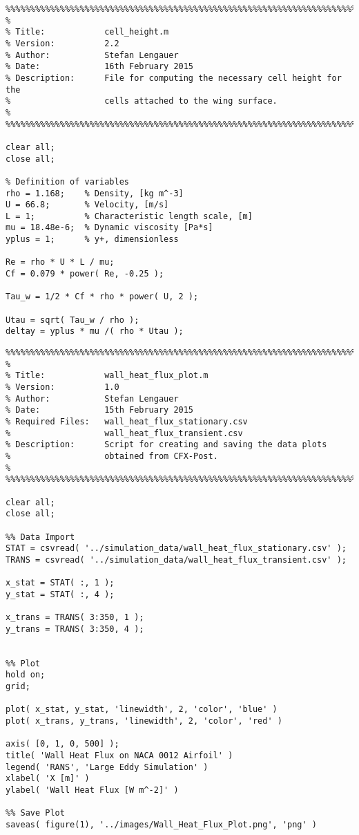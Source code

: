 \begin{lstlisting}
%%%%%%%%%%%%%%%%%%%%%%%%%%%%%%%%%%%%%%%%%%%%%%%%%%%%%%%%%%%%%%%%%%%%%%%%%%%
%
% Title:            cell_height.m
% Version:          2.2
% Author:           Stefan Lengauer
% Date:             16th February 2015
% Description:      File for computing the necessary cell height for the
%                   cells attached to the wing surface.
%
%%%%%%%%%%%%%%%%%%%%%%%%%%%%%%%%%%%%%%%%%%%%%%%%%%%%%%%%%%%%%%%%%%%%%%%%%%%

clear all;
close all;

% Definition of variables
rho = 1.168;    % Density, [kg m^-3]
U = 66.8;       % Velocity, [m/s]
L = 1;          % Characteristic length scale, [m]
mu = 18.48e-6;  % Dynamic viscosity [Pa*s]
yplus = 1;      % y+, dimensionless

Re = rho * U * L / mu;
Cf = 0.079 * power( Re, -0.25 );

Tau_w = 1/2 * Cf * rho * power( U, 2 );

Utau = sqrt( Tau_w / rho );
deltay = yplus * mu /( rho * Utau );
\end{lstlisting}
\newpage
\begin{lstlisting}
%%%%%%%%%%%%%%%%%%%%%%%%%%%%%%%%%%%%%%%%%%%%%%%%%%%%%%%%%%%%%%%%%%%%%%%%%%%
%
% Title:            wall_heat_flux_plot.m
% Version:          1.0
% Author:           Stefan Lengauer
% Date:             15th February 2015
% Required Files:   wall_heat_flux_stationary.csv
%                   wall_heat_flux_transient.csv
% Description:      Script for creating and saving the data plots
%                   obtained from CFX-Post.
%
%%%%%%%%%%%%%%%%%%%%%%%%%%%%%%%%%%%%%%%%%%%%%%%%%%%%%%%%%%%%%%%%%%%%%%%%%%%

clear all;
close all;

%% Data Import
STAT = csvread( '../simulation_data/wall_heat_flux_stationary.csv' );
TRANS = csvread( '../simulation_data/wall_heat_flux_transient.csv' );

x_stat = STAT( :, 1 );
y_stat = STAT( :, 4 );

x_trans = TRANS( 3:350, 1 );
y_trans = TRANS( 3:350, 4 );


%% Plot
hold on;
grid;

plot( x_stat, y_stat, 'linewidth', 2, 'color', 'blue' )
plot( x_trans, y_trans, 'linewidth', 2, 'color', 'red' )

axis( [0, 1, 0, 500] );
title( 'Wall Heat Flux on NACA 0012 Airfoil' )
legend( 'RANS', 'Large Eddy Simulation' )
xlabel( 'X [m]' )
ylabel( 'Wall Heat Flux [W m^-2]' )

%% Save Plot
saveas( figure(1), '../images/Wall_Heat_Flux_Plot.png', 'png' )
\end{lstlisting}
